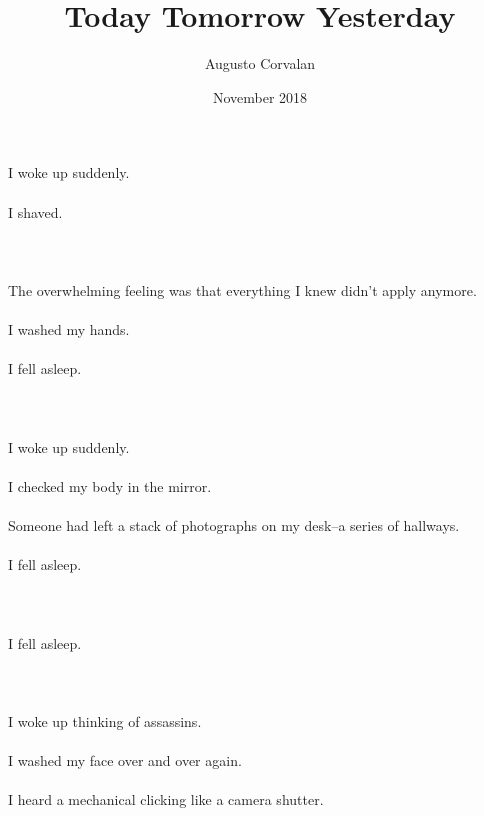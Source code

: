\documentclass{article}
\title{Today Tomorrow Yesterday}
\date{November 2018}
\author{Augusto Corvalan}
\begin{document}
    \maketitle
    
    \section{}
    I woke up suddenly.\\\\I shaved.\\\\ 
    \newpage
    
    \section{}
    The overwhelming feeling was that everything I knew didn't apply anymore.\\\\I washed my hands.\\\\I fell asleep.\\\\ 
    \newpage
    
    \section{}
    I woke up suddenly.\\\\I checked my body in the mirror.\\\\Someone had left a stack of photographs on my desk--a series of hallways.\\\\I fell asleep.\\\\ 
    \newpage
    
    \section{}
    I fell asleep.\\\\ 
    \newpage
    
    \section{}
    I woke up thinking of assassins.\\\\I washed my face over and over again.\\\\I heard a mechanical clicking like a camera shutter.\\\\ 
    \newpage
    
\end{document}
